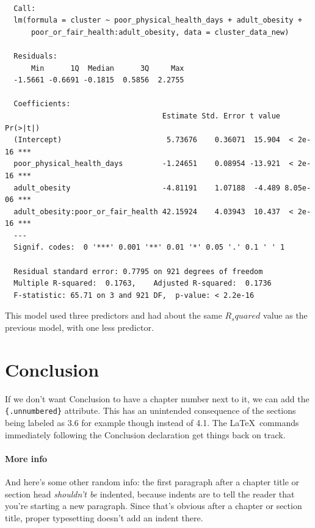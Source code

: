 \documentclass[12pt,twoside]{amherstthesis}
\begin{document}
  \begin{verbatim}
  
  Call:
  lm(formula = cluster ~ poor_physical_health_days + adult_obesity + 
      poor_or_fair_health:adult_obesity, data = cluster_data_new)
  
  Residuals:
      Min      1Q  Median      3Q     Max 
  -1.5661 -0.6691 -0.1815  0.5856  2.2755 
  
  Coefficients:
                                    Estimate Std. Error t value Pr(>|t|)    
  (Intercept)                        5.73676    0.36071  15.904  < 2e-16 ***
  poor_physical_health_days         -1.24651    0.08954 -13.921  < 2e-16 ***
  adult_obesity                     -4.81191    1.07188  -4.489 8.05e-06 ***
  adult_obesity:poor_or_fair_health 42.15924    4.03943  10.437  < 2e-16 ***
  ---
  Signif. codes:  0 '***' 0.001 '**' 0.01 '*' 0.05 '.' 0.1 ' ' 1
  
  Residual standard error: 0.7795 on 921 degrees of freedom
  Multiple R-squared:  0.1763,    Adjusted R-squared:  0.1736 
  F-statistic: 65.71 on 3 and 921 DF,  p-value: < 2.2e-16
  \end{verbatim}
  
  This model used three predictors and had about the same \(R_squared\)
  value as the previous model, with one less predictor.
  
  \chapter*{Conclusion}\label{conclusion}
  
  \setcounter{chapter}{4} \setcounter{section}{0}
  
  If we don't want Conclusion to have a chapter number next to it, we can
  add the \texttt{\{.unnumbered\}} attribute. This has an unintended
  consequence of the sections being labeled as 3.6 for example though
  instead of 4.1. The \LaTeX~commands immediately following the Conclusion
  declaration get things back on track.
  
  \subsubsection{More info}\label{more-info}
  
  And here's some other random info: the first paragraph after a chapter
  title or section head \emph{shouldn't be} indented, because indents are
  to tell the reader that you're starting a new paragraph. Since that's
  obvious after a chapter or section title, proper typesetting doesn't add
  an indent there.
  
\end{document}
